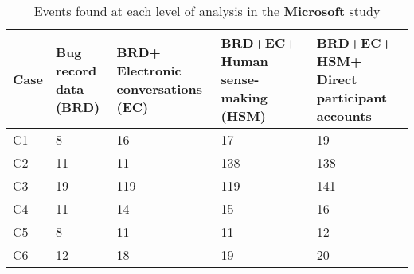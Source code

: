 \begin{table}[tbp]
\caption{\label{tab:MicrosoftEvents} Events found at each level of analysis in the \textbf{Microsoft} study}
\centering
\footnotesize{\begin{tabular}{p{1.4cm}p{2.4cm}p{2.4cm}p{2.4cm}p{2.4cm}}
\hline \hline
\vspace{0.5pt} \bfseries Case & \vspace{0.5pt} \bfseries Bug record data (BRD) & \vspace{0.5pt} \bfseries BRD+ Electronic conversations (EC) & \vspace{0.5pt} \bfseries BRD+EC+ Human sense-making (HSM) & \vspace{0.5pt} \bfseries BRD+EC+ HSM+ Direct participant accounts \\
\hline
\vspace{0.5pt} C1 & \vspace{0.5pt} 8 & \vspace{0.5pt} 16 & \vspace{0.5pt} 17 & \vspace{0.5pt} 19 \\
\hline
\vspace{0.5pt} C2 & \vspace{0.5pt} 11 & \vspace{0.5pt} 11 & \vspace{0.5pt} 138 & \vspace{0.5pt} 138 \\
\hline
\vspace{0.5pt} C3 & \vspace{0.5pt} 19 & \vspace{0.5pt} 119 & \vspace{0.5pt} 119 & \vspace{0.5pt} 141 \\
\hline
\vspace{0.5pt} C4 & \vspace{0.5pt} 11 & \vspace{0.5pt} 14 & \vspace{0.5pt} 15 & \vspace{0.5pt} 16 \\
\hline
\vspace{0.5pt} C5 & \vspace{0.5pt} 8 & \vspace{0.5pt} 11 & \vspace{0.5pt} 11 & \vspace{0.5pt} 12 \\
\hline
\vspace{0.5pt} C6 & \vspace{0.5pt} 12 & \vspace{0.5pt} 18 & \vspace{0.5pt} 19 & \vspace{0.5pt} 20 \\

\end{tabular}}
\end{table}
